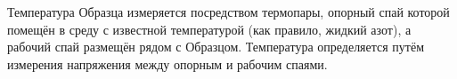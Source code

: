 Температура Образца измеряется посредством термопары, опорный спай которой помещён в среду с известной температурой (как правило, жидкий азот), а рабочий спай размещён рядом с Образцом. Температура определяется путём измерения напряжения между опорным и рабочим спаями.

